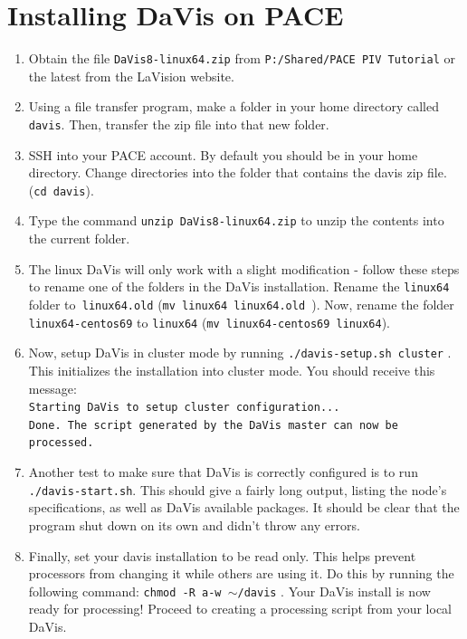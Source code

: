 \documentclass{article}
\begin{document}
	\section{Installing DaVis on PACE}
	\label{installdavis}
	\begin{enumerate}
		\item Obtain the file \texttt{DaVis8-linux64.zip} from \texttt{P:/Shared/PACE PIV Tutorial} or the latest from the LaVision website.
		\item Using a file transfer program, make a folder in your home directory called \texttt{davis}.  Then, transfer the zip file into that new folder.
		\item SSH into your PACE account.  By default you should be in your home directory.  Change directories into the folder that contains the davis zip file. (\texttt{cd davis}).
		\item Type the command \texttt{unzip DaVis8-linux64.zip} to unzip the contents into the current folder.
		\item The linux DaVis will only work with a slight modification - follow these steps to rename one of the folders in the DaVis installation.  Rename the \texttt{linux64} folder to\texttt{ linux64.old} (\texttt{mv linux64 linux64.old }).  Now, rename the folder \texttt{linux64-centos69} to \texttt{linux64} (\texttt{mv linux64-centos69 linux64}).
		\item Now, setup DaVis in cluster mode by running \texttt{./davis-setup.sh cluster} .  This initializes the installation into cluster mode.  You should receive this message: \\ \texttt{Starting DaVis to setup cluster configuration...\\Done. The script generated by the DaVis master can now be processed.}
		\item Another test to make sure that DaVis is correctly configured is to run \texttt{./davis-start.sh}.  This should give a fairly long output,  listing the node's specifications, as well as DaVis available packages.  It should be clear that the program shut down on its own and didn't throw any errors. 
		\item Finally, set your davis installation to be read only.  This helps prevent processors from changing it while others are using it.  Do this by running the following command: \texttt{chmod -R a-w $\sim$/davis} .  Your DaVis install is now ready for processing!  Proceed to creating a processing script from your local DaVis.
		
		
	\end{enumerate}
	
\end{document}
